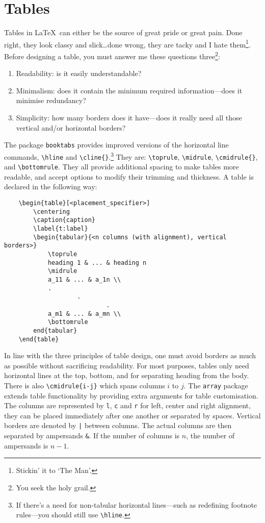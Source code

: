 \section{Tables}
%
Tables in \LaTeX~can either be the source of great pride or great
pain.  Done right, they look classy and slick\ldots done wrong, they
are tacky and I hate them\footnote{Stickin' it to `The Man'.}.  Before
designing a table, you must answer me these questions
three\footnote{You seek the holy grail.}:
\begin{enumerate}
\item Readability: is it easily understandable?
\item Minimalism: does it contain the minimum required
  information---does it minimise redundancy?
\item Simplicity: how many borders does it have---does it really need
  all those vertical and/or horizontal borders?
\end{enumerate}
The package \verb|booktabs| provides improved versions of the
horizontal line commands, \verb|\hline| and
\verb|\cline{}|.\footnote{If there's a need for non-tabular horizontal
  lines---such as redefining footnote rules---you should still use
  \texttt{\textbackslash hline}.}  They are: \verb|\toprule|,
\verb|\midrule|, \verb|\cmidrule{}|, and \verb|\bottomrule|.  They all
provide additional spacing to make tables more readable, and accept
options to modify their trimming and thickness.  A table is declared
in the following way:
\begin{verbatim}
	\begin{table}[<placement_specifier>]
	    \centering
	    \caption{caption}
	    \label{t:label}
	    \begin{tabular}{<n columns (with alignment), vertical borders>}
	        \toprule
	        heading 1 & ... & heading n
	        \midrule
	        a_11 & ... & a_1n \\
	        .
	                .
	                        .
	        a_m1 & ... & a_mn \\
	        \bottomrule
	    end{tabular}
	\end{table}
\end{verbatim}

In line with the three principles of table design, one must avoid
borders as much as possible without sacrificing readability.  For most
purposes, tables only need horizontal lines at the top, bottom, and
for separating heading from the body.  There is also
\verb|\cmidrule{i-j}| which spans columns $i$ to $j$.  The
\verb|array| package extends table functionality by providing extra
arguments for table customisation.  The columns are represented by
\verb|l|, \verb|c| and \verb|r| for left, center and right alignment,
they can be placed immediately after one another or separated by
spaces.  Vertical borders are denoted by \verb+|+ between columns.
The actual columns are then separated by ampersands \verb|&|.  If the
number of columns is $n$, the number of ampersands is $n-1$.

